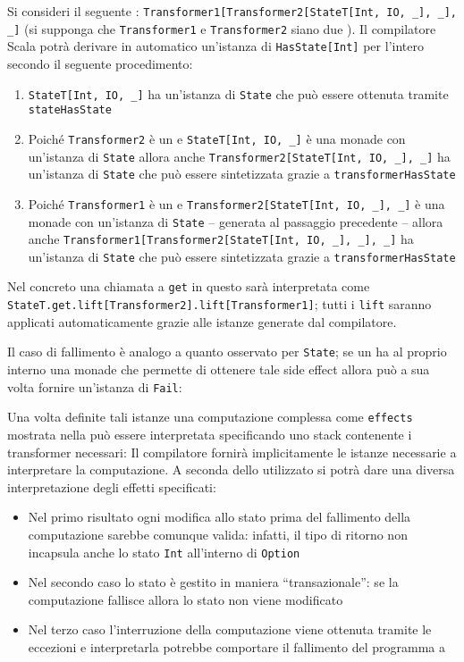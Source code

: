Si consideri il seguente : \lstinline{Transformer1[Transformer2[StateT[Int, IO, _], _], _]} (si supponga che \lstinline{Transformer1} e \lstinline{Transformer2} siano due ). Il compilatore Scala potrà derivare in automatico un'istanza di \lstinline{HasState[Int]} per l'intero  secondo il seguente procedimento:
\begin{enumerate}
  \item \lstinline{StateT[Int, IO, _]} ha un'istanza di \lstinline{State} che può essere ottenuta tramite \lstinline{stateHasState}
  \item Poiché \lstinline{Transformer2} è un  e \lstinline{StateT[Int, IO, _]} è una monade con un'istanza di \lstinline{State} allora anche \lstinline{Transformer2[StateT[Int, IO, _], _]} ha un'istanza di \lstinline{State} che può essere sintetizzata grazie a \lstinline{transformerHasState}
  \item Poiché \lstinline{Transformer1} è un  e \lstinline{Transformer2[StateT[Int, IO, _], _]} è una monade con un'istanza di \lstinline{State} -- generata al passaggio precedente -- allora anche \lstinline{Transformer1[Transformer2[StateT[Int, IO, _], _], _]} ha un'istanza di \lstinline{State} che può essere sintetizzata grazie a \lstinline{transformerHasState}
\end{enumerate}

Nel concreto una chiamata a \lstinline{get} in questo  sarà interpretata come \lstinline{StateT.get.lift[Transformer2].lift[Transformer1]}; tutti i \lstinline{lift} saranno applicati automaticamente grazie alle istanze generate dal compilatore.

Il caso di fallimento è analogo a quanto osservato per \lstinline{State}; se un  ha al proprio interno una monade che permette di ottenere tale side effect allora può a sua volta fornire un'istanza di \lstinline{Fail}:

Una volta definite tali istanze una computazione complessa come \lstinline{effects} mostrata nella  può essere interpretata specificando uno stack contenente i transformer necessari:
Il compilatore fornirà implicitamente le istanze necessarie a interpretare la computazione. A seconda dello  utilizzato si potrà dare una diversa interpretazione degli effetti specificati:
\begin{itemize}
  \item Nel primo risultato ogni modifica allo stato prima del fallimento della computazione sarebbe comunque valida: infatti, il tipo di ritorno non incapsula anche lo stato \lstinline{Int} all'interno di \lstinline{Option}
  \item Nel secondo caso lo stato è gestito in maniera ``transazionale'': se la computazione fallisce allora lo stato non viene modificato
  \item Nel terzo caso l'interruzione della computazione viene ottenuta tramite le eccezioni e interpretarla potrebbe comportare il fallimento del programma a 
\end{itemize}
